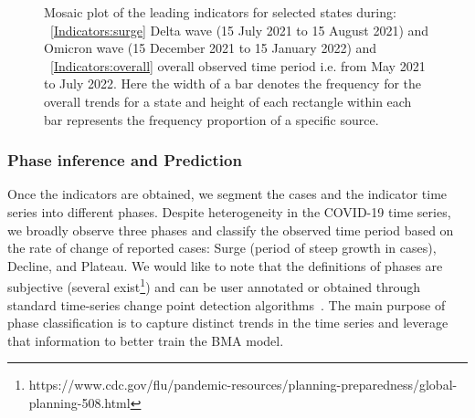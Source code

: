 \documentclass[conference,compsoc]{IEEEtran}
\begin{document}


\begin{figure}[!t]
    \centering
     \hfil
     \caption{Mosaic plot of the leading indicators for selected states during: ~\ref{Indicators:surge} Delta wave (15 July 2021 to 15 August 2021) and  Omicron wave (15 December 2021 to 15 January 2022) and ~\ref{Indicators:overall} overall observed time period i.e. from May 2021 to July 2022. Here the width of a bar denotes the frequency for the overall trends for a state and height of each rectangle within each bar represents the frequency proportion of a specific source.}
 \end{figure}

\subsubsection{Phase inference and Prediction} \label{phase:classification}
Once the indicators are obtained, we segment the cases and the indicator time series into different phases. Despite heterogeneity in the COVID-19 time series, we  broadly observe three phases and classify the observed time period based on the rate of change of reported cases: Surge (period of steep growth in cases), Decline, and Plateau. We would like to note that the definitions of phases are subjective (several exist\footnote{https://www.cdc.gov/flu/pandemic-resources/planning-preparedness/global-planning-508.html}) and can be user annotated or obtained through standard time-series change point detection algorithms~\cite{aminikhanghahi2017survey}. The main purpose of phase classification is to capture distinct trends in the time series and leverage that information to better train the BMA model. 
\end{document}
